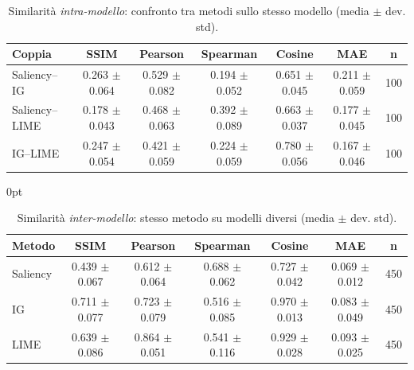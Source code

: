 \documentclass[12pt,a4paper,oneside]{report}
\numberwithin{figure}{chapter}
\numberwithin{table}{chapter}
\newenvironment{tabindent}[1][\parindent]{%
  \begin{table}[H]\begin{adjustwidth}{#1}{0pt}\centering}{%
  \end{adjustwidth}\end{table}}
\begin{document}
\FloatBarrier
{}

\begin{table}[H]
      \centering
      \renewcommand{\arraystretch}{1.05}
      \begin{adjustbox}{max width=\linewidth}
            \begin{tabular}{lccccc c}
                  \hline
                  \textbf{Coppia} & \textbf{SSIM}     & \textbf{Pearson}  & \textbf{Spearman} & \textbf{Cosine}   & \textbf{MAE}      & \textbf{n} \\
                  \hline
                  Saliency–IG     & 0.263 $\pm$ 0.064 & 0.529 $\pm$ 0.082 & 0.194 $\pm$ 0.052 & 0.651 $\pm$ 0.045 & 0.211 $\pm$ 0.059 & 100        \\
                  Saliency–LIME   & 0.178 $\pm$ 0.043 & 0.468 $\pm$ 0.063 & 0.392 $\pm$ 0.089 & 0.663 $\pm$ 0.037 & 0.177 $\pm$ 0.045 & 100        \\
                  IG–LIME         & 0.247 $\pm$ 0.054 & 0.421 $\pm$ 0.059 & 0.224 $\pm$ 0.059 & 0.780 $\pm$ 0.056 & 0.167 $\pm$ 0.046 & 100        \\
                  \hline
            \end{tabular}
      \end{adjustbox}
      \caption{Similarità \emph{intra-modello}: confronto tra metodi sullo stesso modello (media $\pm$ dev. std).}
      \label{tab:sim_intra}
\end{table}

\vspace{-0.3\baselineskip}

\begin{tabindent}
      \renewcommand{\arraystretch}{1.1}
      \begin{adjustbox}{max width=\linewidth}
            \begin{tabular}{lccccc c}
                  \hline
                  \textbf{Metodo} & \textbf{SSIM}     & \textbf{Pearson}  & \textbf{Spearman} & \textbf{Cosine}   & \textbf{MAE}      & \textbf{n} \\
                  \hline
                  Saliency        & 0.439 $\pm$ 0.067 & 0.612 $\pm$ 0.064 & 0.688 $\pm$ 0.062 & 0.727 $\pm$ 0.042 & 0.069 $\pm$ 0.012 & 450        \\
                  IG              & 0.711 $\pm$ 0.077 & 0.723 $\pm$ 0.079 & 0.516 $\pm$ 0.085 & 0.970 $\pm$ 0.013 & 0.083 $\pm$ 0.049 & 450        \\
                  LIME            & 0.639 $\pm$ 0.086 & 0.864 $\pm$ 0.051 & 0.541 $\pm$ 0.116 & 0.929 $\pm$ 0.028 & 0.093 $\pm$ 0.025 & 450        \\
                  \hline
            \end{tabular}
      \end{adjustbox}
      \caption{Similarità \emph{inter-modello}: stesso metodo su modelli diversi (media $\pm$ dev. std).}
      \label{tab:sim_inter}
\end{tabindent}
\end{document}
